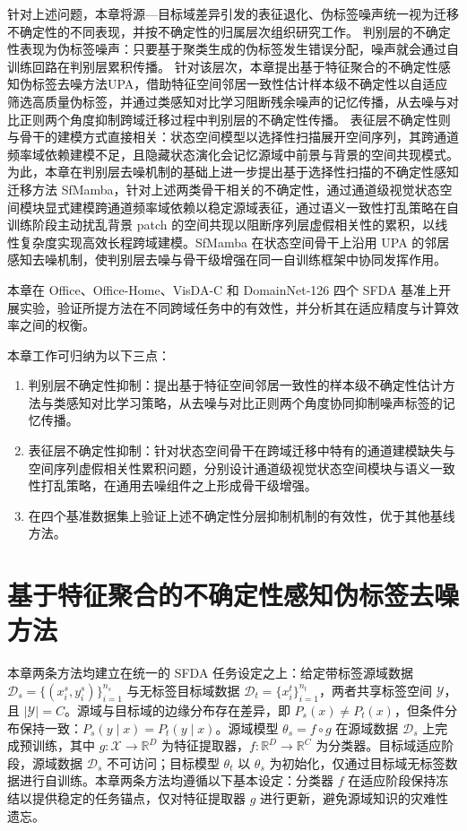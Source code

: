 针对上述问题，本章将源—目标域差异引发的表征退化、伪标签噪声统一视为迁移不确定性的不同表现，并按不确定性的归属层次组织研究工作。
判别层的不确定性表现为伪标签噪声：只要基于聚类生成的伪标签发生错误分配，噪声就会通过自训练回路在判别层累积传播。
针对该层次，本章提出基于特征聚合的不确定性感知伪标签去噪方法UPA，借助特征空间邻居一致性估计样本级不确定性以自适应筛选高质量伪标签，并通过类感知对比学习阻断残余噪声的记忆传播，从去噪与对比正则两个角度抑制跨域迁移过程中判别层的不确定性传播。
表征层不确定性则与骨干的建模方式直接相关：状态空间模型以选择性扫描展开空间序列，其跨通道频率域依赖建模不足，且隐藏状态演化会记忆源域中前景与背景的空间共现模式。为此，本章在判别层去噪机制的基础上进一步提出基于选择性扫描的不确定性感知迁移方法 SfMamba，针对上述两类骨干相关的不确定性，通过通道级视觉状态空间模块显式建模跨通道频率域依赖以稳定源域表征，通过语义一致性打乱策略在自训练阶段主动扰乱背景 patch 的空间共现以阻断序列层虚假相关性的累积，以线性复杂度实现高效长程跨域建模。SfMamba 在状态空间骨干上沿用 UPA 的邻居感知去噪机制，使判别层去噪与骨干级增强在同一自训练框架中协同发挥作用。

本章在 Office、Office-Home、VisDA-C 和 DomainNet-126 四个 SFDA 基准上开展实验，验证所提方法在不同跨域任务中的有效性，并分析其在适应精度与计算效率之间的权衡。

本章工作可归纳为以下三点：
\begin{enumerate}
    \item 判别层不确定性抑制：提出基于特征空间邻居一致性的样本级不确定性估计方法与类感知对比学习策略，从去噪与对比正则两个角度协同抑制噪声标签的记忆传播。
    \item 表征层不确定性抑制：针对状态空间骨干在跨域迁移中特有的通道建模缺失与空间序列虚假相关性累积问题，分别设计通道级视觉状态空间模块与语义一致性打乱策略，在通用去噪组件之上形成骨干级增强。
    \item 在四个基准数据集上验证上述不确定性分层抑制机制的有效性，优于其他基线方法。
\end{enumerate}

\section{基于特征聚合的不确定性感知伪标签去噪方法}

\label{sec:chap2_upa}

本章两条方法均建立在统一的 SFDA 任务设定之上：给定带标签源域数据 $\mathcal{D}_s = \{(x_i^s, y_i^s)\}_{i=1}^{n_s}$ 与无标签目标域数据 $\mathcal{D}_t = \{x_i^t\}_{i=1}^{n_t}$，两者共享标签空间 $\mathcal{Y}$，且 $|\mathcal{Y}| = C$。源域与目标域的边缘分布存在差异，即 $P_s(x) \neq P_t(x)$，但条件分布保持一致：$P_s(y \mid x) = P_t(y \mid x)$。源域模型 $\theta_s = f \circ g$ 在源域数据 $\mathcal{D}_s$ 上完成预训练，其中 $g: \mathcal{X} \to \mathbb{R}^D$ 为特征提取器，$f: \mathbb{R}^D \to \mathbb{R}^C$ 为分类器。目标域适应阶段，源域数据 $\mathcal{D}_s$ 不可访问；目标模型 $\theta_t$ 以 $\theta_s$ 为初始化，仅通过目标域无标签数据进行自训练。本章两条方法均遵循以下基本设定：分类器 $f$ 在适应阶段保持冻结以提供稳定的任务锚点，仅对特征提取器 $g$ 进行更新，避免源域知识的灾难性遗忘。

